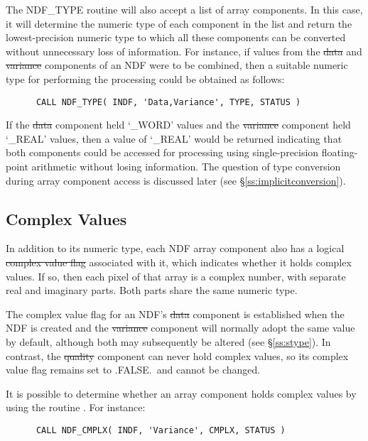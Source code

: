 The NDF\_TYPE routine will also accept a list of array components.
In this case, it will determine the numeric type of each component in the
list and return the lowest-precision numeric type to which all these
components can be converted without unnecessary loss of information. 
For instance, if values from the \st{data\/} and \st{variance\/} components of
an NDF were to be combined, then a suitable numeric type for performing the
processing could be obtained as follows: 

\small
\begin{verbatim}
      CALL NDF_TYPE( INDF, 'Data,Variance', TYPE, STATUS )
\end{verbatim}
\normalsize

If the \st{data\/} component held `\_WORD' values and the \st{variance\/}
component held `\_REAL' values, then a value of `\_REAL' would be returned
indicating that both components could be accessed for processing using
single-precision floating-point arithmetic without losing information. 
The question of type conversion during array component access is discussed
later (see \S\ref{ss:implicitconversion}).

\subsection{Complex Values}

In addition to its numeric type, each NDF array component also has a logical
\st{complex value flag\/} associated with it, which indicates whether it
holds complex values. 
If so, then each pixel of that array is a complex number, with separate real
and imaginary parts. 
Both parts share the same numeric type.

The complex value flag for an NDF's \st{data\/} component is established when the
NDF is created and the \st{variance\/} component will normally adopt the same
value by default, although both may subsequently be altered (see
\S\ref{ss:stype}).
In contrast, the \st{quality\/} component can never hold complex values, so its 
complex value flag remains set to .FALSE.\ and cannot be changed.

It is possible to determine whether an array component holds complex values 
by using the routine .
For instance:

\small
\begin{verbatim}
      CALL NDF_CMPLX( INDF, 'Variance', CMPLX, STATUS )
\end{verbatim}
\normalsize

